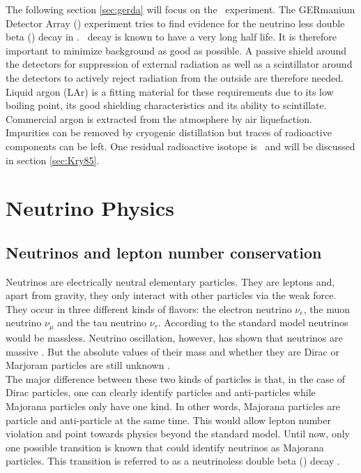 \documentclass[encoding=utf8,british]{tumphthesis}
\begin{document}
The following section \ref{sec:gerda} will focus on the \gerda\ experiment.
The GERmanium Detector Array (\gerda) experiment tries to find evidence for the neutrino less double beta (\onbb) decay in .
\onbb\ decay is known to have a very long half life.
It is therefore important to minimize background as good as possible. 
A passive shield around the detectors for suppression of external radiation as well as a scintillator around the detectors to actively reject radiation from the outside are therefore needed.
Liquid argon (LAr) is a fitting material for these requirements due to its low boiling point, its good shielding characteristics and its ability to scintillate. 
Commercial argon is extracted from the atmosphere by air liquefaction. 
Impurities can be removed by cryogenic distillation but traces of radioactive components can be left.
One residual radioactive isotope is \Kr\ and  will be discussed in section \ref{sec:Kry85}. 
\\


\section{Neutrino Physics}
\label{sec:PhyBG}

\subsection{Neutrinos and lepton number conservation}

Neutrinos are electrically neutral elementary particles.
They are leptons and, apart from gravity, they only interact with other particles via the weak force.
They occur in three different kinds of flavors: the electron neutrino $\nu_e$, the muon neutrino $\nu_{\mu}$ and the tau neutrino $\nu_{\tau}$.
According to the standard model neutrinos would be massless.
Neutrino oscillation, however, has shown that neutrinos are massive \cite{fukuda_evidence_1998}.
But the absolute values of their mass and whether they are Dirac or Marjoram particles are still unknown \cite{barabash_brief_2017}.
\\

The major difference between these two kinds of particles is that, in the case of Dirac particles, one can clearly identify particles and anti-particles while Majorana particles only have one kind.
In other words, Majorana particles are particle and anti-particle at the same time.
This would allow lepton number violation and point towards physics beyond the standard model.
Until now, only one possible transition is known that could identify neutrinos as Majorana particles.
This transition is referred to as a neutrinoless double beta (\onbb) decay \cite{schechter_neutrinoless_1982}.
 
\end{document}
